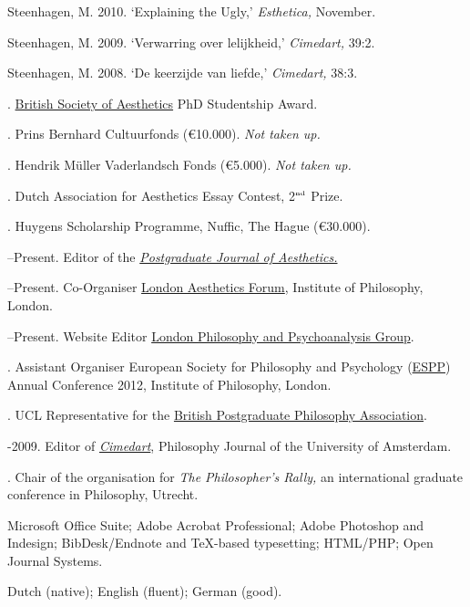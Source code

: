 \documentclass[11pt]{article}
\begin{document}
\medskip

\ind  Steenhagen, M. 2010. `Explaining the Ugly,' \emph{Esthetica,} November.

\ind  Steenhagen, M. 2009. `Verwarring over lelijkheid,' \emph{Cimedart,} 39:2.

\ind  Steenhagen, M. 2008. `De keerzijde van liefde,' \emph{Cimedart,} 38:3.

\bigskip

\medskip

. \href{http://www.british-aesthetics.org}{British Society of Aesthetics} PhD Studentship Award. %

. Prins Bernhard Cultuurfonds (€10.000). \emph{Not taken up.}

. Hendrik Müller Vaderlandsch Fonds (€5.000). \emph{Not taken up.} 

. Dutch Association for Aesthetics Essay Contest, 2$^{\textrm{\tiny{nd}}}$ Prize.

. Huygens Scholarship Programme, Nuffic, The Hague (€30.000).

\bigskip 

\medskip

--Present. Editor of the \href{http:\\www.pjaesthetics.org}{\emph{Postgraduate Journal of Aesthetics.}}

--Present. Co-Organiser \href{http:\\www.londonaestheticsforum.org}{London Aesthetics Forum}, Institute of Philosophy, London.

--Present. Website Editor \href{http://www.philosophy-psychoanalysis.org.uk}{London Philosophy and Psychoanalysis Group}.

. Assistant Organiser European Society for Philosophy and Psychology (\href{http://www.eurospp.org}{ESPP}) Annual Conference 2012, Institute of Philosophy, London. 

. UCL Representative for the \href{http://www.bppa-online.org}{British Postgraduate Philosophy Association}.

-2009. Editor of \href{http://www.cimedart.nl}{\emph{Cimedart}}, Philosophy Journal of the University of Amsterdam.

. Chair of the organisation for \emph{The Philosopher's Rally,} an international graduate conference in Philosophy, Utrecht.

\bigskip 

\medskip

\ind Microsoft Office Suite; Adobe Acrobat Professional; Adobe Photoshop and Indesign; BibDesk/Endnote and TeX-based typesetting; HTML/PHP; Open Journal Systems.

\bigskip 

\medskip

\ind Dutch (native); English (fluent); German (good).

\rfoot{\footnotesize{\today}}
\end{document}

